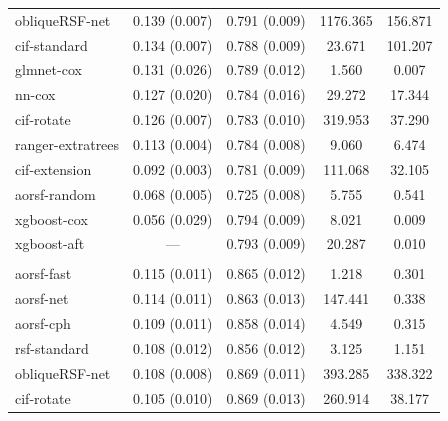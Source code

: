 \documentclass[twoside,11pt]{article}\usepackage[]{graphicx}\usepackage[]{xcolor}
\newenvironment{knitrout}{}{} %
\begin{document}
\begin{knitrout}
\begin{longtable}[t]{lcccc}
\hspace{1em}obliqueRSF-net & 0.139 (0.007) & 0.791 (0.009) & 1176.365 & 156.871\\
\hspace{1em}cif-standard & 0.134 (0.007) & 0.788 (0.009) & 23.671 & 101.207\\
\hspace{1em}glmnet-cox & 0.131 (0.026) & 0.789 (0.012) & 1.560 & 0.007\\
\hspace{1em}nn-cox & 0.127 (0.020) & 0.784 (0.016) & 29.272 & 17.344\\
\hspace{1em}cif-rotate & 0.126 (0.007) & 0.783 (0.010) & 319.953 & 37.290\\
\hspace{1em}ranger-extratrees & 0.113 (0.004) & 0.784 (0.008) & 9.060 & 6.474\\
\hspace{1em}cif-extension & 0.092 (0.003) & 0.781 (0.009) & 111.068 & 32.105\\
\hspace{1em}aorsf-random & 0.068 (0.005) & 0.725 (0.008) & 5.755 & 0.541\\
\hspace{1em}xgboost-cox & 0.056 (0.029) & 0.794 (0.009) & 8.021 & 0.009\\
\hspace{1em}xgboost-aft & --- & 0.793 (0.009) & 20.287 & 0.010\\
\addlinespace[0.3em]
\multicolumn{5}{l}{\textit{\textbf{MESA; heart failure, n = 6785, p = 48}}}\\
\hline
\hspace{1em}aorsf-fast & 0.115 (0.011) & 0.865 (0.012) & 1.218 & 0.301\\
\hspace{1em}aorsf-net & 0.114 (0.011) & 0.863 (0.013) & 147.441 & 0.338\\
\hspace{1em}aorsf-cph & 0.109 (0.011) & 0.858 (0.014) & 4.549 & 0.315\\
\hspace{1em}rsf-standard & 0.108 (0.012) & 0.856 (0.012) & 3.125 & 1.151\\
\hspace{1em}obliqueRSF-net & 0.108 (0.008) & 0.869 (0.011) & 393.285 & 338.322\\
\hspace{1em}cif-rotate & 0.105 (0.010) & 0.869 (0.013) & 260.914 & 38.177\\

\end{longtable}
\end{knitrout}
\end{document}
